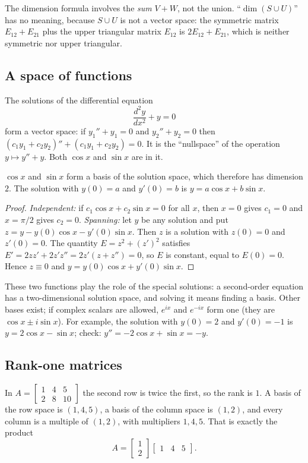 \begin{trap}
The dimension formula involves the \emph{sum} $V+W$, not the union. ``$\dim(S\cup U)$'' has no
meaning, because $S\cup U$ is not a vector space: the symmetric matrix $E_{12}+E_{21}$ plus the
upper triangular matrix $E_{12}$ is $2E_{12}+E_{21}$, which is neither symmetric nor upper
triangular.
\end{trap}

\subsection{A space of functions}

The solutions of the differential equation
\[
\frac{d^2y}{dx^2}+y=0
\]
form a vector space: if $y_1''+y_1=0$ and $y_2''+y_2=0$ then $(c_1y_1+c_2y_2)''+(c_1y_1+c_2y_2)=0$.
It is the ``nullspace'' of the operation $y\mapsto y''+y$. Both $\cos x$ and $\sin x$ are in it.

\begin{theorem}[Solutions of \texorpdfstring{\(y''+y=0\)}{y''+y=0}]\label{thm:u12-ode}
$\cos x$ and $\sin x$ form a basis of the solution space, which therefore has dimension $2$. The
solution with $y(0)=a$ and $y'(0)=b$ is $y=a\cos x+b\sin x$.
\end{theorem}
\begin{proof}
\emph{Independent:} if $c_1\cos x+c_2\sin x=0$ for all $x$, then $x=0$ gives $c_1=0$ and
$x=\pi/2$ gives $c_2=0$.
\emph{Spanning:} let $y$ be any solution and put $z=y-y(0)\cos x-y'(0)\sin x$. Then $z$ is a
solution with $z(0)=0$ and $z'(0)=0$. The quantity $E=z^2+(z')^2$ satisfies
$E'=2zz'+2z'z''=2z'(z+z'')=0$, so $E$ is constant, equal to $E(0)=0$. Hence $z\equiv0$ and
$y=y(0)\cos x+y'(0)\sin x$.
\end{proof}

These two functions play the role of the special solutions: a second-order equation has a
two-dimensional solution space, and solving it means finding a basis. Other bases exist; if complex
scalars are allowed, $e^{ix}$ and $e^{-ix}$ form one (they are $\cos x\pm i\sin x$). For example,
the solution with $y(0)=2$ and $y'(0)=-1$ is $y=2\cos x-\sin x$; check:
$y''=-2\cos x+\sin x=-y$.

\subsection{Rank-one matrices}

\begin{example}\label{ex:u12-rank1}
In $A=\begin{bmatrix}1&4&5\\2&8&10\end{bmatrix}$ the second row is twice the first, so the rank is
$1$. A basis of the row space is $(1,4,5)$, a basis of the column space is $(1,2)$, and every column
is a multiple of $(1,2)$, with multipliers $1,4,5$. That is exactly the product
\[
A=\begin{bmatrix}1\\2\end{bmatrix}\begin{bmatrix}1&4&5\end{bmatrix}.
\]
\end{example}

